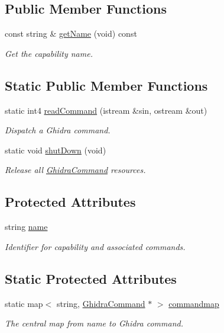 \subsection*{Public Member Functions}
\begin{DoxyCompactItemize}
\item 
const string \& \mbox{\hyperlink{class_ghidra_capability_a5928ab9d0dd3212f9f7a732c62a3e390}{get\+Name}} (void) const
\begin{DoxyCompactList}\small\item\em Get the capability name. \end{DoxyCompactList}\end{DoxyCompactItemize}
\subsection*{Static Public Member Functions}
\begin{DoxyCompactItemize}
\item 
static int4 \mbox{\hyperlink{class_ghidra_capability_a778472d4da43daeda23553684f87ad80}{read\+Command}} (istream \&sin, ostream \&out)
\begin{DoxyCompactList}\small\item\em Dispatch a Ghidra command. \end{DoxyCompactList}\item 
static void \mbox{\hyperlink{class_ghidra_capability_a3fd0105536597651f42c98ed1dbc2b7e}{shut\+Down}} (void)
\begin{DoxyCompactList}\small\item\em Release all \mbox{\hyperlink{class_ghidra_command}{Ghidra\+Command}} resources. \end{DoxyCompactList}\end{DoxyCompactItemize}
\subsection*{Protected Attributes}
\begin{DoxyCompactItemize}
\item 
string \mbox{\hyperlink{class_ghidra_capability_acb74036589d576cd7241c92337ca0eb4}{name}}
\begin{DoxyCompactList}\small\item\em Identifier for capability and associated commands. \end{DoxyCompactList}\end{DoxyCompactItemize}
\subsection*{Static Protected Attributes}
\begin{DoxyCompactItemize}
\item 
static map$<$ string, \mbox{\hyperlink{class_ghidra_command}{Ghidra\+Command}} $\ast$ $>$ \mbox{\hyperlink{class_ghidra_capability_a01f9c0ce45ccac28d5fa79d75c752587}{commandmap}}
\begin{DoxyCompactList}\small\item\em The central map from {\itshape name} to Ghidra command. \end{DoxyCompactList}\end{DoxyCompactItemize}
